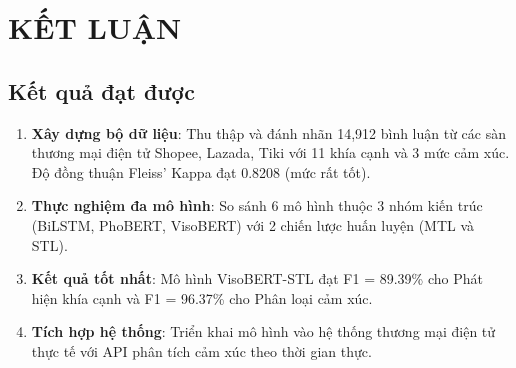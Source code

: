 
\newpage
\section{\textbf{KẾT LUẬN}}


\subsection{Kết quả đạt được}
\begin{enumerate}
    \item \textbf{Xây dựng bộ dữ liệu}: Thu thập và đánh nhãn 14,912 bình luận từ các sàn thương mại điện tử Shopee, Lazada, Tiki với 11 khía cạnh và 3 mức cảm xúc. Độ đồng thuận Fleiss' Kappa đạt 0.8208 (mức rất tốt).
    
    \item \textbf{Thực nghiệm đa mô hình}: So sánh 6 mô hình thuộc 3 nhóm kiến trúc (BiLSTM, PhoBERT, VisoBERT) với 2 chiến lược huấn luyện (MTL và STL).
    
    \item \textbf{Kết quả tốt nhất}: Mô hình VisoBERT-STL đạt F1 = 89.39\% cho Phát hiện khía cạnh và F1 = 96.37\% cho Phân loại cảm xúc.
    
    \item \textbf{Tích hợp hệ thống}: Triển khai mô hình vào hệ thống thương mại điện tử thực tế với API phân tích cảm xúc theo thời gian thực.
\end{enumerate}


